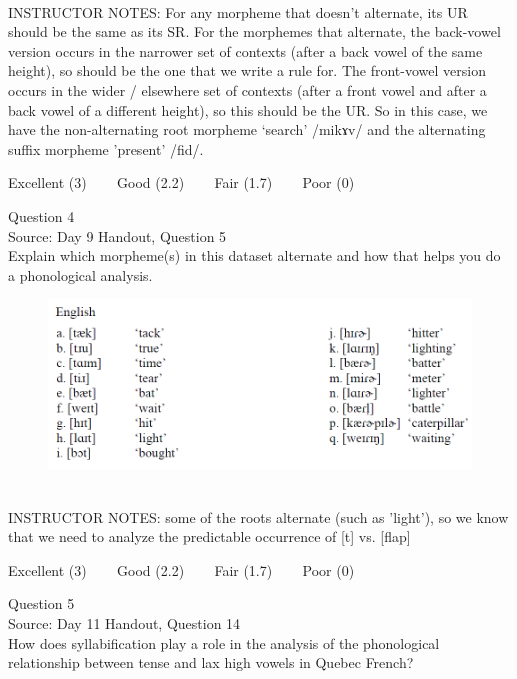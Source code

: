 \documentclass[12pt]{article}
\begin{document}
~\\
INSTRUCTOR NOTES: For any morpheme that doesn’t alternate, its UR should be the same as its SR.  For the morphemes that alternate, the back-vowel version occurs in the narrower set of contexts (after a back vowel of the same height), so should be the one that we write a rule for. The front-vowel version occurs in the wider / elsewhere set of contexts (after a front vowel and after a back vowel of a different height), so this should be the UR. So in this case, we have the non-alternating root morpheme ‘search’ /mikɤv/ and the alternating suffix morpheme 'present' /fid/.


\vfill
Excellent (3) ~~~ Good (2.2) ~~~ Fair (1.7) ~~~ Poor (0)
\newpage

{\large Question 4}\\

Source: Day 9 Handout, Question 5\\

Explain which morpheme(s) in this dataset alternate and how that helps you do a phonological analysis.\\

\begin{figure}[H]
\includegraphics{../images/english_t_flap.png}
\end{figure}

~\\
INSTRUCTOR NOTES: some of the roots alternate (such as 'light'), so we know that we need to analyze the predictable occurrence of [t] vs. [flap]


\vfill
Excellent (3) ~~~ Good (2.2) ~~~ Fair (1.7) ~~~ Poor (0)
\newpage

{\large Question 5}\\

Source: Day 11 Handout, Question 14\\

How does syllabification play a role in the analysis of the phonological relationship between tense and lax high vowels in Quebec French?\\
\end{document}
